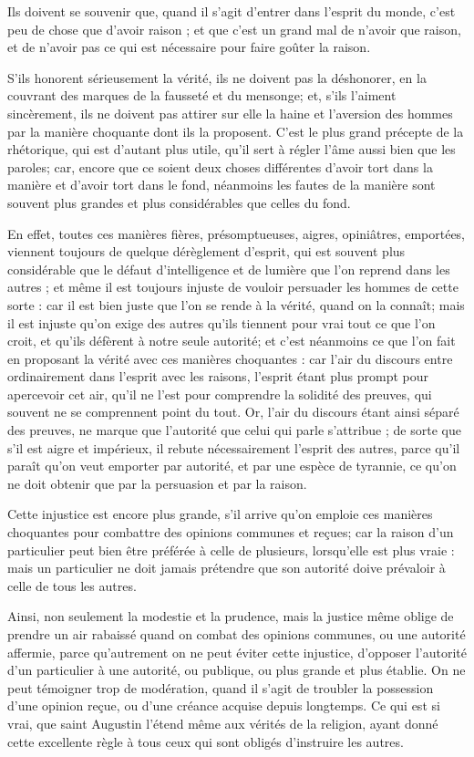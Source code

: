 Ils doivent se souvenir que, quand il s'agit d'entrer dans l'esprit du monde, c'est peu de chose que d'avoir raison ; et que c'est un grand mal de n'avoir que raison, et de n'avoir pas ce qui est nécessaire pour faire goûter la raison.

S'ils honorent sérieusement la vérité, ils ne doivent pas la déshonorer, en la couvrant des marques de la fausseté et du mensonge; et, s'ils l'aiment sincèrement, ils ne doivent pas attirer sur elle la haine et l'aversion des hommes par la manière choquante dont ils la proposent. C'est le plus grand précepte de la rhétorique, qui est d'autant plus utile, qu'il sert à régler l'âme aussi bien que les paroles; car, encore que ce soient deux choses différentes d'avoir tort dans la manière et d'avoir tort dans le fond, néanmoins les fautes de la manière sont souvent plus grandes et plus considérables que celles du fond.

En effet, toutes ces manières fières, présomptueuses, aigres, opiniâtres, emportées, viennent toujours de quelque dérèglement d'esprit, qui est souvent plus considérable que le défaut d'intelligence et de lumière que l'on reprend dans les autres ; et même il est toujours injuste de vouloir persuader les hommes de cette sorte : car il est bien juste que l'on se rende à la vérité, quand on la connaît; mais il est injuste qu'on exige des autres qu'ils tiennent pour vrai tout ce que l'on croit, et qu'ils défèrent à notre seule autorité; et c'est néanmoins ce que l'on fait en proposant la vérité avec ces manières choquantes : car l'air du discours entre ordinairement dans l'esprit avec les raisons, l'esprit étant plus prompt pour apercevoir cet air, qu'il ne l'est pour comprendre la solidité des preuves, qui souvent ne se comprennent point du tout. Or, l'air du discours étant ainsi séparé des preuves, ne marque que l'autorité que celui qui parle s'attribue ; de sorte que s'il est aigre et impérieux, il rebute nécessairement l'esprit des autres, parce qu'il paraît qu'on veut emporter par autorité, et par une espèce de tyrannie, ce qu'on ne doit obtenir que par la persuasion et par la raison.

Cette injustice est encore plus grande, s'il arrive qu'on emploie ces manières choquantes pour combattre des opinions communes et reçues; car la raison d'un particulier peut bien être préférée à celle de plusieurs, lorsqu'elle est plus vraie : mais un particulier ne doit jamais prétendre que son autorité doive prévaloir à celle de tous les autres.

Ainsi, non seulement la modestie et la prudence, mais la justice même oblige de prendre un air rabaissé quand on combat des opinions communes, ou une autorité affermie, parce qu'autrement on ne peut éviter cette injustice, d'opposer l'autorité d'un particulier à une autorité, ou publique, ou plus grande et plus établie. On ne peut témoigner trop de modération, quand il s'agit de troubler la possession d'une opinion reçue, ou d'une créance acquise depuis longtemps. Ce qui est si vrai, que saint Augustin l'étend même aux vérités de la religion, ayant donné cette excellente règle à tous ceux qui sont obligés d'instruire les autres.

